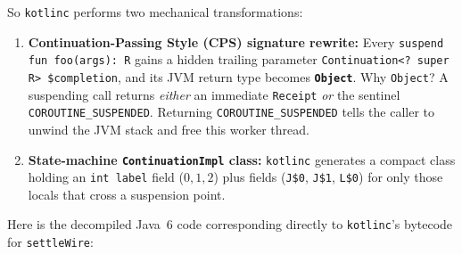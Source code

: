So \texttt{kotlinc} performs two mechanical transformations:
\begin{enumerate}
  \item \textbf{Continuation-Passing Style (CPS) signature rewrite:} Every \texttt{suspend fun foo(args): R} gains a hidden trailing parameter \texttt{Continuation<? super R> \$completion}, and its JVM return type becomes \textbf{\texttt{Object}}. Why \texttt{Object}? A suspending call returns \emph{either} an immediate \texttt{Receipt} \emph{or} the sentinel \texttt{COROUTINE\_SUSPENDED}. Returning \texttt{COROUTINE\_SUSPENDED} tells the caller to unwind the JVM stack and free this worker thread.
  \item \textbf{State-machine \texttt{ContinuationImpl} class:} \texttt{kotlinc} generates a compact class holding an \texttt{int label} field ($0, 1, 2$) plus fields (\texttt{J\$0}, \texttt{J\$1}, \texttt{L\$0}) for only those locals that cross a suspension point.
\end{enumerate}

Here is the decompiled Java~6 code corresponding directly to \texttt{kotlinc}'s bytecode for \texttt{settleWire}:

